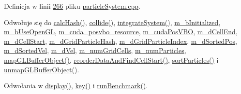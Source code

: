 Definicja w linii \hyperlink{particle_system_8cpp_source_l00266}{266} pliku \hyperlink{particle_system_8cpp_source}{particle\-System.\-cpp}.



Odwołuje się do \hyperlink{particle_system__cuda_8cu_source_l00163}{calc\-Hash()}, \hyperlink{particle_system__cuda_8cu_source_l00225}{collide()}, \hyperlink{particle_system__cuda_8cu_source_l00149}{integrate\-System()}, \hyperlink{particle_system_8h_source_l00193}{m\-\_\-b\-Initialized}, \hyperlink{particle_system_8h_source_l00193}{m\-\_\-b\-Use\-Open\-G\-L}, \hyperlink{particle_system_8h_source_l00225}{m\-\_\-cuda\-\_\-posvbo\-\_\-resource}, \hyperlink{particle_system_8h_source_l00222}{m\-\_\-cuda\-Pos\-V\-B\-O}, \hyperlink{particle_system_8h_source_l00215}{m\-\_\-d\-Cell\-End}, \hyperlink{particle_system_8h_source_l00214}{m\-\_\-d\-Cell\-Start}, \hyperlink{particle_system_8h_source_l00212}{m\-\_\-d\-Grid\-Particle\-Hash}, \hyperlink{particle_system_8h_source_l00213}{m\-\_\-d\-Grid\-Particle\-Index}, \hyperlink{particle_system_8h_source_l00208}{m\-\_\-d\-Sorted\-Pos}, \hyperlink{particle_system_8h_source_l00209}{m\-\_\-d\-Sorted\-Vel}, \hyperlink{particle_system_8h_source_l00206}{m\-\_\-d\-Vel}, \hyperlink{particle_system_8h_source_l00231}{m\-\_\-num\-Grid\-Cells}, \hyperlink{particle_system_8h_source_l00194}{m\-\_\-num\-Particles}, \hyperlink{particle_system__cuda_8cu_source_l00099}{map\-G\-L\-Buffer\-Object()}, \hyperlink{particle_system__cuda_8cu_source_l00184}{reorder\-Data\-And\-Find\-Cell\-Start()}, \hyperlink{particle_system__cuda_8cu_source_l00271}{sort\-Particles()} i \hyperlink{particle_system__cuda_8cu_source_l00109}{unmap\-G\-L\-Buffer\-Object()}.



Odwołania w \hyperlink{particles_8cpp_source_l00405}{display()}, \hyperlink{particles_8cpp_source_l00737}{key()} i \hyperlink{particles_8cpp_source_l00306}{run\-Benchmark()}.


